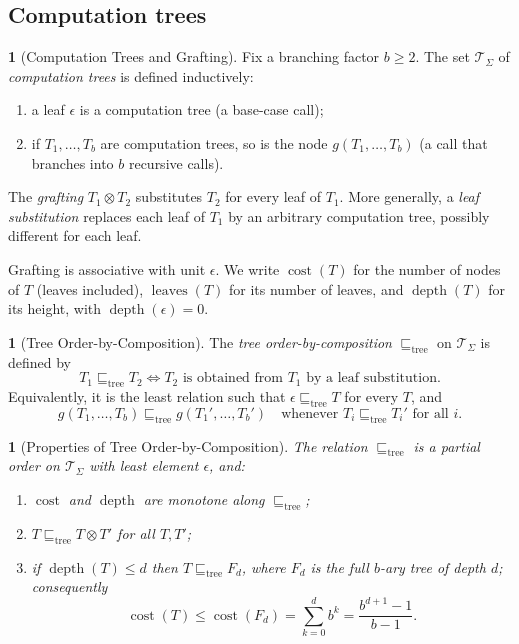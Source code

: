 \documentclass[oneside,english]{amsart}
\numberwithin{equation}{section}
\numberwithin{figure}{section}
\theoremstyle{plain}
\theoremstyle{definition}
\newtheorem{defn}[thm]{\protect\definitionname}
\theoremstyle{plain}
\newtheorem{prop}[thm]{\protect\propositionname}
\theoremstyle{remark}
\theoremstyle{plain}
\theoremstyle{definition}
\theoremstyle{plain}
\theoremstyle{remark}
\DeclareMathOperator{\cost}{cost}
\DeclareMathOperator{\depth}{depth}
\DeclareMathOperator{\leaves}{leaves}
\providecommand{\definitionname}{Definition}
\providecommand{\propositionname}{Proposition}
\begin{document}
\subsection{Computation trees}

\begin{defn}[Computation Trees and Grafting]\label{def:tree-algebra}
Fix a branching factor $b \ge 2$. The set $\mathcal{T}_\Sigma$ of \textit{computation trees} is defined inductively:
\begin{enumerate}
    \item a leaf $\epsilon$ is a computation tree (a base-case call);
    \item if $T_1, \dots, T_b$ are computation trees, so is the node $g(T_1, \dots, T_b)$ (a call that branches into $b$ recursive calls).
\end{enumerate}
The \textit{grafting} $T_1 \otimes T_2$ substitutes $T_2$ for every leaf of $T_1$. More generally, a \textit{leaf substitution} replaces each leaf of $T_1$ by an arbitrary computation tree, possibly different for each leaf.
\end{defn}

Grafting is associative with unit $\epsilon$. We write $\cost(T)$ for the number of nodes of $T$ (leaves included), $\leaves(T)$ for its number of leaves, and $\depth(T)$ for its height, with $\depth(\epsilon) = 0$.

\begin{defn}[Tree Order-by-Composition]\label{def:tree-order}
The \textit{tree order-by-composition} $\sqsubseteq_{\text{tree}}$ on $\mathcal{T}_\Sigma$ is defined by
\[
T_1 \sqsubseteq_{\text{tree}} T_2 \iff T_2 \text{ is obtained from } T_1 \text{ by a leaf substitution.}
\]
Equivalently, it is the least relation such that $\epsilon \sqsubseteq_{\text{tree}} T$ for every $T$, and
\[
g(T_1, \dots, T_b) \sqsubseteq_{\text{tree}} g(T_1', \dots, T_b') \quad \text{whenever } T_i \sqsubseteq_{\text{tree}} T_i' \text{ for all } i.
\]
\end{defn}

\begin{prop}[Properties of Tree Order-by-Composition]\label{prop:tree-order-properties}
The relation $\sqsubseteq_{\text{tree}}$ is a partial order on $\mathcal{T}_\Sigma$ with least element $\epsilon$, and:
\begin{enumerate}
    \item $\cost$ and $\depth$ are monotone along $\sqsubseteq_{\text{tree}}$;
    \item $T \sqsubseteq_{\text{tree}} T \otimes T'$ for all $T, T'$;
    \item if $\depth(T) \le d$ then $T \sqsubseteq_{\text{tree}} F_d$, where $F_d$ is the full $b$-ary tree of depth $d$; consequently
    \[
    \cost(T) \le \cost(F_d) = \sum_{k=0}^d b^k = \frac{b^{d+1}-1}{b-1}.
    \]
\end{enumerate}
\end{prop}
\end{document}
